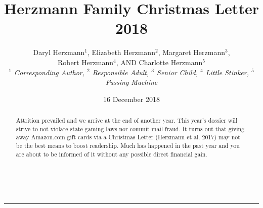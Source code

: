 \documentclass[letterpaper,11pt]{article}
\title{\vspace{-2.0cm}Herzmann Family Christmas Letter 2018}
\author{Daryl Herzmann${}^1$, Elizabeth Herzmann${}^2$, Margaret 
Herzmann${}^3$,\\
Robert Herzmann${}^4$, AND Charlotte Herzmann${}^5$ \\
\it{${}^1$ Corresponding Author},
\it{${}^2$ Responsible Adult},
\it{${}^3$ Senior Child},
\it{${}^4$ Little Stinker},
\it{${}^5$ Fussing Machine}}
\date{16 December 2018}
\newcommand{\Line}[0]{%
  \rule{0cm}{0cm}\\\hrule\rule{0cm}{0cm}%
}
\begin{document}
\maketitle
\vspace{-0.75cm}
\begin{abstract}
Attrition prevailed and we arrive at the end of another year. This year's
dossier will strive to not violate state gaming laws nor commit mail fraud. It
turns out that giving away Amazon.com gift cards via a Christmas Letter
(Herzmann et al. 2017) may not
be the best means to boost readership.  Much has happened in the past year and
you are about to be informed of it without any possible direct financial gain.
\end{abstract}

\vspace{-0.5cm}
\Line
\end{document}
